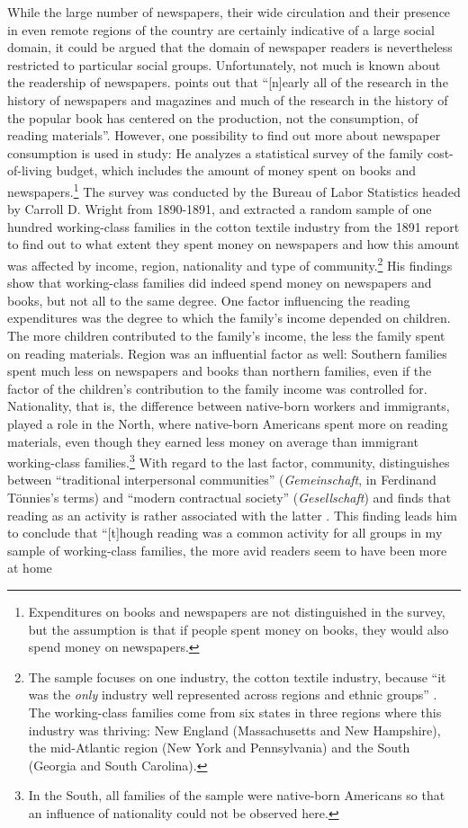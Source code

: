 \largerpage
While the large number of newspapers, their wide circulation and their presence in even remote regions of the country are certainly indicative of a large social domain, it could be argued that the domain of newspaper readers is nevertheless restricted to particular social groups. Unfortunately, not much is known about the readership of newspapers. \citet[225]{Nord2001} points out that “[n]early all of the research in the history of newspapers and magazines and much of the research in the history of the popular book has centered on the production, not the consumption, of reading materials”. However, one possibility to find out more about newspaper consumption is used in  study: He analyzes a statistical survey of the family cost-of-living budget, which includes the amount of money spent on books and newspapers.\footnote{Expenditures on books and newspapers are not distinguished in the survey, but the assumption is that if people spent money on books, they would also spend money on newspapers.} The survey was conducted by the Bureau of Labor Statistics headed by Carroll D. Wright from 1890-1891, and \citet{Nord2001} extracted a random sample of one hundred working-class families in the cotton textile industry from the 1891 report to find out to what extent they spent money on newspapers and how this amount was affected by income, region, nationality and type of community.\footnote{The sample focuses on one industry, the cotton textile industry, because “it was the \emph{only} industry well represented across regions and ethnic groups” \citep[229]{Nord2001}. The working-class families come from six states in three regions where this industry was thriving: New England (Massachusetts and New Hampshire), the mid-Atlantic region (New York and Pennsylvania) and the South (Georgia and South Carolina).} His findings show that working-class families did indeed spend money on newspapers and books, but not all to the same degree. One factor influencing the reading expenditures was the degree to which the family’s income depended on children. The more children contributed to the family’s income, the less the family spent on reading materials. Region was an influential factor as well: Southern families spent much less on newspapers and books than northern families, even if the factor of the children’s contribution to the family income was controlled for. Nationality, that is, the difference between native-born workers and immigrants, played a role in the North, where native-born Americans spent more on reading materials, even though they earned less money on average than immigrant working-class families.\footnote{In the South, all families of the sample were native-born Americans so that an influence of nationality could not be observed here.} With regard to the last factor, community, \citet[239]{Nord2001} distinguishes between “traditional interpersonal communities” (\textit{Gemeinschaft}, in Ferdinand Tönnies’s terms) and “modern contractual society” (\textit{Gesellschaft}) and finds that reading as an activity is rather associated with the latter \citep[240]{Nord2001}. This finding leads him to conclude that “[t]hough reading was a common activity for all groups in my sample of working-class families, the more avid readers seem to have been more at home 